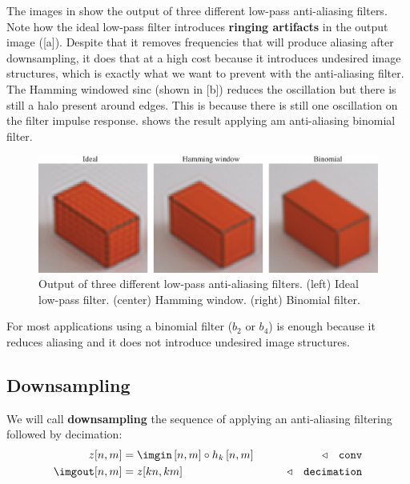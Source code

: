 The images in \fig{\ref{fig:ringing_artifacts}} show the output of three different low-pass anti-aliasing filters. Note how the ideal low-pass filter introduces {\bf ringing artifacts} in the output image (\fig{\ref{fig:ringing_artifacts}}[a]). Despite that it removes frequencies that will produce aliasing after downsampling, it does that at a high cost because it introduces undesired image structures, which is exactly what we want to prevent with the anti-aliasing filter. The Hamming windowed sinc (shown in \fig{\ref{fig:ringing_artifacts}}[b]) reduces the oscillation but there is still a halo present around edges. This is because there is still one oscillation on the filter impulse response.  shows the result applying am anti-aliasing binomial filter.

\begin{figure}[h!]
	\centerline{
		\includegraphics[width=1\linewidth]{figures/upsamplig_downsampling/ringing_artifacts.eps}
	}
	\caption{Output of three different low-pass anti-aliasing filters. (left) Ideal low-pass filter. (center) Hamming window. (right) Binomial filter.}
	\label{fig:ringing_artifacts}
\end{figure}

For most applications using a binomial filter ($b_2$ or $b_4$) is enough because it reduces aliasing and it does not introduce undesired image structures.

\subsection{Downsampling}

We will call {\bf downsampling} the sequence of applying an anti-aliasing filtering followed by decimation:
\begin{align}
	z[n,m]        & = \imgin \left[n,m\right] \circ h_k \left[ n,m \right] & \quad\quad \triangleleft \quad \texttt{conv}       \\
	\imgout [n,m] & = z[kn,km]                                             & \quad\quad \triangleleft \quad \texttt{decimation}
\end{align}

